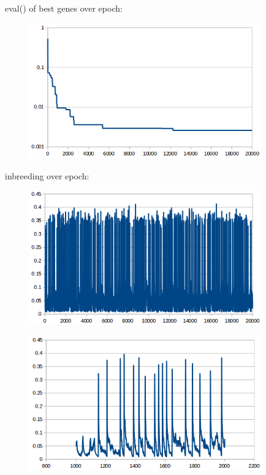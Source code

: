 eval() of best genes over epoch:\\
\begin{center}
\begin{figure}[H]
\centering\includegraphics[width=10cm]{./eval.png}\\
\end{figure}
\end{center}

inbreeding over epoch:\\
\begin{center}
\begin{figure}[H]
\centering\includegraphics[width=10cm]{./inbreeding.png}\\
\end{figure}
\end{center}
\begin{center}
\begin{figure}[H]
\centering\includegraphics[width=10cm]{./inbreeding-extract.png}\\
\end{figure}
\end{center}
